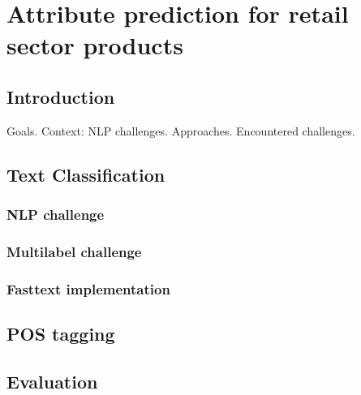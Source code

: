 \chapter{Attribute prediction for retail sector products} %
\label{cha:attribute_prediction_for_retail_sector_products}

\section{Introduction} %
\label{sec:introduction}

Goals.
Context: NLP challenges.
Approaches.
Encountered challenges. 

\section{Text Classification} %
\label{sec:}

\subsection{NLP challenge}

\subsection{Multilabel challenge}

\subsection{Fasttext implementation}

\section{POS tagging} %
\label{sec:}


\section{Evaluation} %
\label{sec:evaluation}


